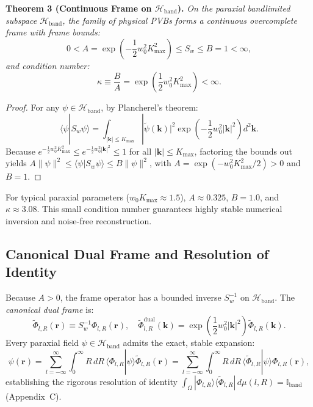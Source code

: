 \documentclass{optica-article}
\begin{document}
\noindent\textbf{Theorem 3 (Continuous Frame on $\mathcal{H}_{\text{band}}$).}  
\emph{On the paraxial bandlimited subspace $\mathcal{H}_{\text{band}}$, the family of physical PVBs forms a continuous overcomplete frame with frame bounds:}
\begin{equation}
\boxed{0 < A = \exp\left( - \frac{1}{2} w_0^2 K_{\max}^2 \right) \le S_w \le B = 1 < \infty,}
\label{eq:frame_bounds}
\end{equation}
\emph{and condition number:}
\begin{equation}
\kappa \equiv \frac{B}{A} = \exp\left( \frac{1}{2} w_0^2 K_{\max}^2 \right) < \infty.
\end{equation}

\begin{proof}
For any $\psi \in \mathcal{H}_{\text{band}}$, by Plancherel's theorem:
\begin{equation}
\langle \psi | S_w \psi \rangle = \int_{|\mathbf{k}| \le K_{\max}} |\widetilde{\psi}(\mathbf{k})|^2 \exp\left( - \frac{1}{2} w_0^2 |\mathbf{k}|^2 \right) d^2\mathbf{k}.
\end{equation}
Because $e^{-\frac{1}{2} w_0^2 K_{\max}^2} \le e^{-\frac{1}{2} w_0^2 |\mathbf{k}|^2} \le 1$ for all $|\mathbf{k}| \le K_{\max}$, factoring the bounds out yields $A \|\psi\|^2 \le \langle \psi | S_w \psi \rangle \le B \|\psi\|^2$, with $A = \exp(-w_0^2 K_{\max}^2 / 2) > 0$ and $B = 1$.
\end{proof}

For typical paraxial parameters ($w_0 K_{\max} \approx 1.5$), $A \approx 0.325$, $B = 1.0$, and $\kappa \approx 3.08$. This small condition number guarantees highly stable numerical inversion and noise-free reconstruction.

\subsection{Canonical Dual Frame and Resolution of Identity}

Because $A > 0$, the frame operator has a bounded inverse $S_w^{-1}$ on $\mathcal{H}_{\text{band}}$. The \emph{canonical dual frame} is:
\begin{equation}
\widetilde{\Phi}_{l, R}(\mathbf{r}) \equiv S_w^{-1} \Phi_{l, R}(\mathbf{r}), \quad \widetilde{\Phi}_{l, R}^{\text{dual}}(\mathbf{k}) = \exp\left( \frac{1}{2} w_0^2 |\mathbf{k}|^2 \right) \widetilde{\Phi}_{l, R}(\mathbf{k}).
\end{equation}
Every paraxial field $\psi \in \mathcal{H}_{\text{band}}$ admits the exact, stable expansion:
\begin{equation}
\boxed{\psi(\mathbf{r}) = \sum_{l=-\infty}^\infty \int_0^\infty R \, dR \, \langle \Phi_{l, R} | \psi \rangle \widetilde{\Phi}_{l, R}(\mathbf{r}) = \sum_{l=-\infty}^\infty \int_0^\infty R \, dR \, \langle \widetilde{\Phi}_{l, R} | \psi \rangle \Phi_{l, R}(\mathbf{r}),}
\label{eq:dual_expansion}
\end{equation}
establishing the rigorous resolution of identity $\int_\Omega |\Phi_{l, R}\rangle \langle \widetilde{\Phi}_{l, R}| \, d\mu(l, R) = \mathbb{I}_{\text{band}}$ (Appendix~C).
\end{document}
